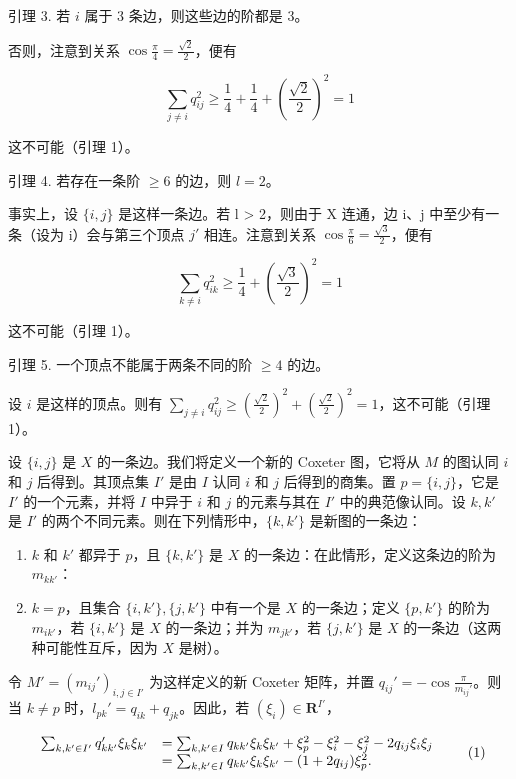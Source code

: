 引理 3. 若 \(i\) 属于 3 条边，则这些边的阶都是 3。

否则，注意到关系 \(\cos \frac{\pi}{4} = \frac{\sqrt{2}}{2}\)，便有

\[
\sum_ {j \neq i} q _ {i j} ^ {2} \geqslant \frac {1}{4} + \frac {1}{4} + (\frac {\sqrt {2}}{2}) ^ {2} = 1
\]

这不可能（引理 1）。

引理 4. 若存在一条阶 \(\geqslant 6\) 的边，则 \(l = 2\)。

事实上，设 \(\{i,j\}\) 是这样一条边。若 l \textgreater{} 2，则由于 X 连通，边 i、j 中至少有一条（设为 i）会与第三个顶点 \(j'\) 相连。注意到关系 \(\cos \frac{\pi}{6} = \frac{\sqrt{3}}{2}\)，便有

\[
\sum_ {k \neq i} q _ {i k} ^ {2} \geqslant \frac {1}{4} + (\frac {\sqrt {3}}{2}) ^ {2} = 1
\]

这不可能（引理 1）。

引理 5. 一个顶点不能属于两条不同的阶 \(\geqslant 4\) 的边。

设 \(i\) 是这样的顶点。则有 \(\sum_{j\neq i}q_{ij}^{2}\geqslant (\frac{\sqrt{2}}{2})^{2} + (\frac{\sqrt{2}}{2})^{2} = 1\)，这不可能（引理 1）。

设 \(\{i, j\}\) 是 \(X\) 的一条边。我们将定义一个新的 Coxeter 图，它将从 \(M\) 的图认同 \(i\) 和 \(j\) 后得到。其顶点集 \(I'\) 是由 \(I\) 认同 \(i\) 和 \(j\) 后得到的商集。置 \(p = \{i, j\}\)，它是 \(I'\) 的一个元素，并将 \(I\) 中异于 \(i\) 和 \(j\) 的元素与其在 \(I'\) 中的典范像认同。设 \(k, k'\) 是 \(I'\) 的两个不同元素。则在下列情形中，\(\{k, k'\}\) 是新图的一条边：

\begin{enumerate}
\def\labelenumi{\arabic{enumi})}
\item
  \(k\) 和 \(k'\) 都异于 \(p\)，且 \(\{k, k'\}\) 是 \(X\) 的一条边：在此情形，定义这条边的阶为 \(m_{kk'}\)：
\item
  \(k = p\)，且集合 \(\{i, k'\}, \{j, k'\}\) 中有一个是 \(X\) 的一条边；定义 \(\{p, k'\}\) 的阶为 \(m_{ik'}\)，若 \(\{i, k'\}\) 是 \(X\) 的一条边；并为 \(m_{jk'}\)，若 \(\{j, k'\}\) 是 \(X\) 的一条边（这两种可能性互斥，因为 \(X\) 是树）。
\end{enumerate}

令 \(M' = (m_{ij}')_{i,j \in I'}\) 为这样定义的新 Coxeter 矩阵，并置 \(q_{ij}' = -\cos \frac{\pi}{m_{ij}'}\)。则当 \(k \neq p\) 时，\(l_{pk}' = q_{ik} + q_{jk}\)。因此，若 \((\xi_i) \in \mathbf{R}^{I'}\)，

\[
\begin{array}{r l} \sum_ {k, k ^ {\prime} \in I ^ {\prime}} q _ {k k ^ {\prime}} ^ {\prime} \xi_ {k} \xi_ {k ^ {\prime}} & = \sum_ {k, k ^ {\prime} \in I} q _ {k k ^ {\prime}} \xi _ {k} \xi_ {k ^ {\prime}} + \xi_ {p} ^ {2} - \xi_ {i} ^ {2} - \xi_ {j} ^ {2} - 2 q _ {i j} \xi_ {i} \xi_ {j} \\ & = \sum_ {k, k ^ {\prime} \in I} q _ {k k ^ {\prime}} \xi _ {k} \xi_ {k ^ {\prime}} - (1 + 2 q _ {i j}) \xi_ {p} ^ {2}. \end{array} \tag {1}
\]

